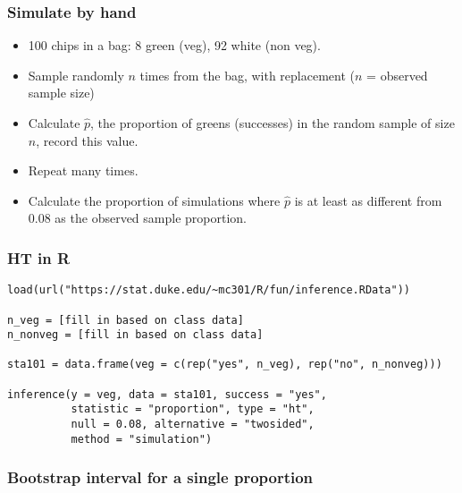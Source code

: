 \documentclass[slidestop,compress,mathserif,12pt,t,professionalfonts,xcolor=table]{beamer}
\begin{document}

\begin{frame}
\frametitle{Simulate by hand}


\pause

\begin{itemize}
\item 100 chips in a bag: 8 green (veg), 92 white (non veg).
\pause
\item Sample randomly $n$ times from the bag, with replacement ($n$ = observed sample size)
\pause
\item Calculate $\hat{p}$, the proportion of greens (successes) in the random sample of size $n$, 
record this value.
\pause
\item Repeat many times.
\pause
\item Calculate the proportion of simulations where $\hat{p}$ is at least as different from 0.08 
as the observed sample proportion.
\end{itemize}

\end{frame}


\begin{frame}[fragile]
\frametitle{HT in R}

{\footnotesize
\begin{verbatim}
load(url("https://stat.duke.edu/~mc301/R/fun/inference.RData"))

n_veg = [fill in based on class data]
n_nonveg = [fill in based on class data]

sta101 = data.frame(veg = c(rep("yes", n_veg), rep("no", n_nonveg)))

inference(y = veg, data = sta101, success = "yes", 
          statistic = "proportion", type = "ht", 
          null = 0.08, alternative = "twosided", 
          method = "simulation")
\end{verbatim}
}

\end{frame}


\begin{frame}
\frametitle{Bootstrap interval for a single proportion}

\vfill


\vfill

\end{frame}
\end{document}
